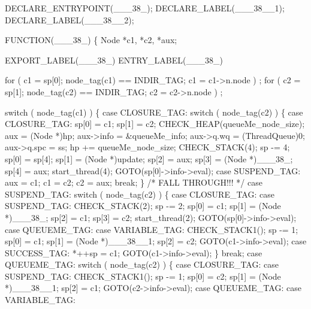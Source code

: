 \nwenddocs{}\plusendmoddef\nwstartdeflinemarkup{}\nwenddeflinemarkup
DECLARE_ENTRYPOINT(___38_);
DECLARE_LABEL(___38__1);
DECLARE_LABEL(___38__2);

FUNCTION(___38_)
\{
    Node *c1, *c2, *aux;

    EXPORT_LABEL(___38_)
 ENTRY_LABEL(___38_)

    for ( c1 = sp[0]; node_tag(c1) == INDIR_TAG; c1 = c1->n.node )
        ;
    for ( c2 = sp[1]; node_tag(c2) == INDIR_TAG; c2 = c2->n.node )
        ;

    switch ( node_tag(c1) )
    \{
    case CLOSURE_TAG:
        switch ( node_tag(c2) )
        \{
        case CLOSURE_TAG:
            sp[0] = c1;
            sp[1] = c2;
            CHECK_HEAP(queueMe_node_size);
            aux        = (Node *)hp;
            aux->info  = &queueMe_info;
            aux->q.wq  = (ThreadQueue)0;
            aux->q.spc = ss;
            hp        += queueMe_node_size;
            CHECK_STACK(4);
            sp   -= 4;
            sp[0] = sp[4];
            sp[1] = (Node *)update;
            sp[2] = aux;
            sp[3] = (Node *)___38_;
            sp[4] = aux;
            start_thread(4);
            GOTO(sp[0]->info->eval);
        case SUSPEND_TAG:
            aux = c1;
            c1  = c2;
            c2  = aux;
            break;
        \}
        /* FALL THROUGH!!! */
    case SUSPEND_TAG:
        switch ( node_tag(c2) )
        \{
        case CLOSURE_TAG:
        case SUSPEND_TAG:
            CHECK_STACK(2);
            sp   -= 2;
            sp[0] = c1;
            sp[1] = (Node *)___38_;
            sp[2] = c1;
            sp[3] = c2;
            start_thread(2);
            GOTO(sp[0]->info->eval);
        case QUEUEME_TAG:
        case VARIABLE_TAG:
            CHECK_STACK1();
            sp   -= 1;
            sp[0] = c1;
            sp[1] = (Node *)___38__1;
            sp[2] = c2;
            GOTO(c1->info->eval);
        case SUCCESS_TAG:
            *++sp = c1;
            GOTO(c1->info->eval);
        \}
        break;
    case QUEUEME_TAG:
        switch ( node_tag(c2) )
        \{
        case CLOSURE_TAG:
        case SUSPEND_TAG:
            CHECK_STACK1();
            sp   -= 1;
            sp[0] = c2;
            sp[1] = (Node *)___38__1;
            sp[2] = c1;
            GOTO(c2->info->eval);
        case QUEUEME_TAG:
        case VARIABLE_TAG:
